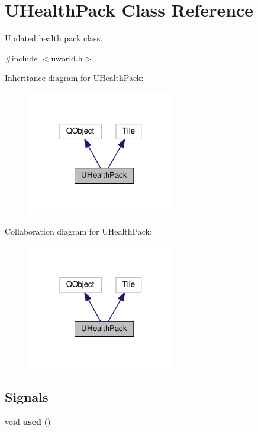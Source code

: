 \hypertarget{classUHealthPack}{}\section{U\+Health\+Pack Class Reference}
\label{classUHealthPack}


Updated health pack class.  




{\ttfamily \#include $<$uworld.\+h$>$}



Inheritance diagram for U\+Health\+Pack\+:\nopagebreak
\begin{figure}[H]
\begin{center}
\leavevmode
\includegraphics[width=184pt]{d5/dd8/classUHealthPack__inherit__graph}
\end{center}
\end{figure}


Collaboration diagram for U\+Health\+Pack\+:\nopagebreak
\begin{figure}[H]
\begin{center}
\leavevmode
\includegraphics[width=184pt]{df/da1/classUHealthPack__coll__graph}
\end{center}
\end{figure}
\subsection*{Signals}
\begin{DoxyCompactItemize}
\item 
void {\bfseries used} ()\hypertarget{classUHealthPack_a1f5645d92da31de8300ad6885875cf92}{}\label{classUHealthPack_a1f5645d92da31de8300ad6885875cf92}

\end{DoxyCompactItemize}
